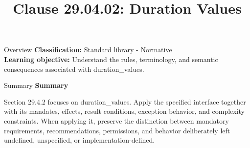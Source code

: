 \documentclass[10pt,letterpaper]{article}
\title{Clause 29.04.02: Duration Values}
\author{}
\date{}
\begin{document}
\maketitle
\begin{CornellOverviewBox}{Overview}
\textbf{Classification:} Standard library - Normative\\[2pt]
\textbf{Learning objective:} Understand the rules, terminology, and semantic consequences associated with duration\_values.
\end{CornellOverviewBox}\begin{CornellSummaryBox}{Summary}
{\sffamily\bfseries\color{Accent} Summary}\par\vspace{3pt}Section 29.4.2 focuses on duration\_values. Apply the specified interface together with its mandates, effects, result conditions, exception behavior, and complexity constraints. When applying it, preserve the distinction between mandatory requirements, recommendations, permissions, and behavior deliberately left undefined, unspecified, or implementation-defined.
\end{CornellSummaryBox}
\end{document}
